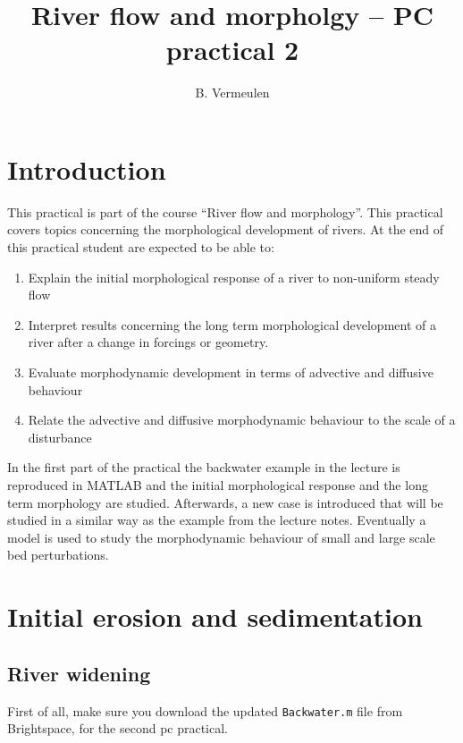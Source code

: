 \documentclass[a4paper]{article}
\title{River flow and morpholgy -- PC practical 2}
\author{B. Vermeulen}
\begin{document}
\maketitle
\tableofcontents


\section{Introduction}
\label{sec:intro}
This practical is part of the course ``River flow and morphology''. This practical covers topics concerning the morphological development of rivers. At the end of this practical student are expected to be able to:
\begin{enumerate}
  \item Explain the initial morphological response of a river to non-uniform steady flow
  \item Interpret results concerning the long term morphological development of a river after a change in forcings or geometry.
  \item Evaluate morphodynamic development in terms of advective and diffusive behaviour
  \item Relate the advective and diffusive morphodynamic behaviour to the scale of a disturbance
\end{enumerate}

In the first part of the practical the backwater example in the lecture is reproduced in MATLAB and the initial morphological response and the long term morphology are studied.
Afterwards, a new case is introduced that will be studied in a similar way as the example from the lecture notes.
Eventually a model is used to study the morphodynamic behaviour of small and large scale bed perturbations.

\section{Initial erosion and sedimentation}

\subsection{River widening}
First of all, make sure you download the updated \lstinline{Backwater.m} file from Brightspace, for the second pc practical.
\end{document}
